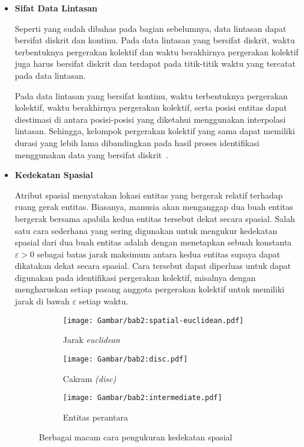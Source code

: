 \begin{itemize}
    \item \textbf{Sifat Data Lintasan}
    
    Seperti yang sudah dibahas pada bagian sebelumnya, data lintasan dapat bersifat diskrit dan kontinu. Pada data lintasan yang bersifat diskrit, waktu terbentuknya pergerakan kolektif dan waktu berakhirnya pergerakan kolektif juga harus bersifat diskrit dan terdapat pada titik-titik waktu yang tercatat pada data lintasan.
    
    Pada data lintasan yang bersifat kontinu, waktu terbentuknya pergerakan kolektif, waktu berakhirnya pergerakan kolektif, serta posisi entitas dapat diestimasi di antara posisi-posisi yang diketahui menggunakan interpolasi lintasan. Sehingga, kelompok pergerakan kolektif yang sama dapat memiliki durasi yang lebih lama dibandingkan pada hasil proses identifikasi menggunakan data yang bersifat diskrit~\cite{wiratma:trajectory}.

    \item \textbf{Kedekatan Spasial}
    
    Atribut spasial menyatakan lokasi entitas yang bergerak relatif terhadap ruang gerak entitas. Biasanya, manusia akan menganggap dua buah entitas bergerak bersama apabila kedua entitas tersebut dekat secara spasial. Salah satu cara sederhana yang sering digunakan untuk mengukur kedekatan spasial dari dua buah entitas adalah dengan menetapkan sebuah konstanta $\varepsilon > 0$ \iffalse \lionov{pake varepsilon ($\varepsilon$)} \fi sebagai batas jarak maksimum antara kedua entitas supaya dapat dikatakan dekat secara spasial. Cara tersebut dapat diperluas untuk dapat digunakan pada identifikasi pergerakan kolektif, misalnya dengan mengharuskan setiap pasang anggota pergerakan kolektif untuk memiliki jarak di bawah $\varepsilon$ setiap waktu.
    
    \begin{figure}[h]
        \centering
        \begin{subfigure}[h]{0.25\textwidth}
            \centering
            \texttt{[image: Gambar/bab2:spatial-euclidean.pdf]}
            \caption{Jarak \textit{euclidean}}
        \end{subfigure} \hspace{0.5cm}
        \begin{subfigure}[h]{0.25\textwidth}
            \centering
            \texttt{[image: Gambar/bab2:disc.pdf]}
            \caption{Cakram \textit{(disc)}}
        \end{subfigure} \hspace{0.5cm}
        \begin{subfigure}[h]{0.25\textwidth}
            \centering
            \texttt{[image: Gambar/bab2:intermediate.pdf]}
            \caption{Entitas perantara}
        \end{subfigure}
        \caption[Pengukuran kedekatan spasial]{Berbagai macam cara pengukuran kedekatan spasial}
        \label{bab2:spasial}
    \end{figure}
    

\end{itemize}
